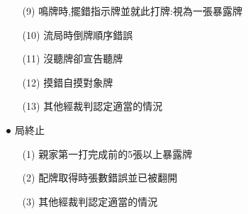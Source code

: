 \documentclass[a4paper,12pt]{article}
\begin{document}
\begin{itemize}
\begin{itemize}
        \item[(9)] 鳴牌時,擺錯指示牌並就此打牌:視為一張暴露牌
        \item[(10)] 流局時倒牌順序錯誤
        \item[(11)] 沒聽牌卻宣告聽牌
        \item[(12)] 摸錯自摸對象牌
        \item[(13)] 其他經裁判認定適當的情況
    \end{itemize}
    \item[●] 局終止
    \begin{itemize}
        \item[(1)] 親家第一打完成前的5張以上暴露牌
        \item[(2)] 配牌取得時張數錯誤並已被翻開
        \item[(3)] 其他經裁判認定適當的情況
    \end{itemize}
\end{itemize}
\end{document}
